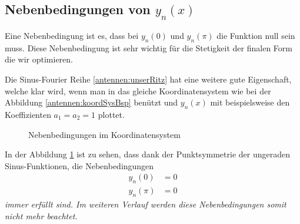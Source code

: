 \subsection{Nebenbedingungen von $y_n(x)$\label{antenennen:nebenbedRitz}}

Eine Nebenbedingung ist es, dass bei $y_n(0)$ und $y_n(\pi)$ die Funktion null sein muss.
Diese Nebenbedingung ist sehr wichtig für die Stetigkeit der finalen Form die wir optimieren.

Die Sinus-Fourier Reihe \eqref{antennen:unserRitz} hat eine weitere gute Eigenschaft, 
welche klar wird, wenn man in das gleiche Koordinatensystem wie bei der Abbildung \ref{antennen:koordSysBsp}
benützt und $y_n(x)$ mit beispielsweise den Koeffizienten $a_1=a_2=1$ plottet.

\begin{figure}[htbp]
	\centering
	\caption{Nebenbedingungen im Koordinatensystem}
	\label{antennen:nebenbedGrafik}
\end{figure}

In der Abbildung \ref{antennen:nebenbedGrafik} ist zu sehen, dass dank der Punktsymmetrie 
der ungeraden Sinus-Funktionen, die Nebenbedingungen
\begin{equation}
	\begin{aligned}
		y_n(0)
		&=
		0
		\\
		y_n(\pi)
		&=
		0
	\end{aligned}
\label{antennen:nebenbed3eck}
\end{equation}
\em immer erfüllt \em sind. Im weiteren Verlauf werden diese 
Nebenbedingungen somit nicht mehr beachtet.


